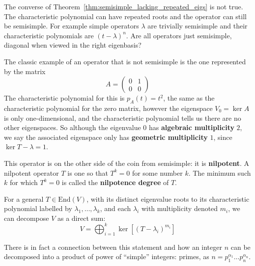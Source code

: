 	The converse of Theorem~\ref{thm:semisimple_lacking_repeated_eigs} is not true. The characteristic polynomial can have repeated roots and the operator can still be semisimple. For example simple operators $\lambda$ are trivially semisimple and their characteristic polynomials are $(t-\lambda)^n$. Are all operators just semisimple, diagonal when viewed in the right eigenbasis?
	
	The classic example of an operator that is not semisimple is the one represented by the matrix
	\begin{equation*}
		A= \begin{pmatrix}
			 0 & 1 \\
			 0 & 0
		\end{pmatrix}
	\end{equation*}
	The characteristic polynomial for this is $p_A(t) = t^2$, the same as the characteristic polynomial for the zero matrix, however the eigenspace $V_0 = \ker A$ is only one-dimensional, and the characteristic polynomial tells us there are no other eigenspaces. So although the eigenvalue $0$ has \textbf{algebraic multiplicity} $2$, we say the associated eigenspace only has \textbf{geometric multiplicity} $1$, since $\ker T - \lambda = 1$.
	
	This operator is on the other side of the coin from semisimple: it is \textbf{nilpotent}. A nilpotent operator $T$ is one so that $T^k = 0$ for some number $k$. The minimum such $k$ for which $T^k = 0$ is called the \textbf{nilpotence degree} of $T$.
	

	\begin{theorem}
		For a general $T \in \mathrm{End}(V)$, with its distinct eigenvalue roots to its characteristic polynomial labelled by $\lambda_1, \dots, \lambda_k$, and each $\lambda_i$ with multiplicity denoted $m_i$, we can decompose $V$ as a direct sum:
		\begin{equation}
			V = \bigoplus_{i=1}^k \ker \left[ (T - \lambda_i)^{m_i} \right]
		\end{equation}
	\end{theorem}
	There is in fact a connection between this statement and how an integer $n$ can be decomposed into a product of power of ``simple'' integers: primes, as $n = p_1 ^{\alpha_1} \dots p_n ^{\alpha_n}$.




